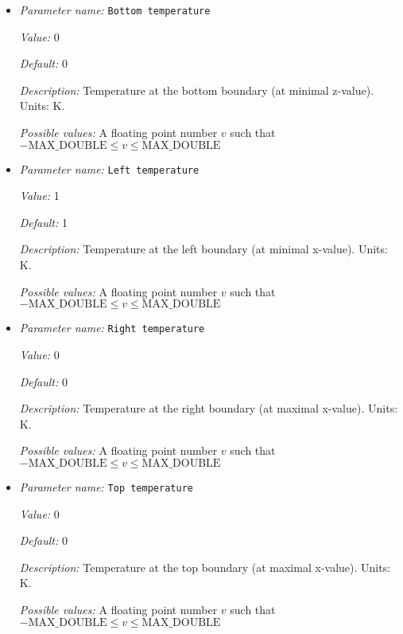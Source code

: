 \begin{itemize}
\item {\it Parameter name:} {\tt Bottom temperature}
\label{parameters:Boundary temperature model/Box/Bottom temperature}


{\it Value:} 0


{\it Default:} 0


{\it Description:} Temperature at the bottom boundary (at minimal z-value). Units: K.


{\it Possible values:} A floating point number $v$ such that $-\text{MAX\_DOUBLE} \leq v \leq \text{MAX\_DOUBLE}$
\item {\it Parameter name:} {\tt Left temperature}
\label{parameters:Boundary temperature model/Box/Left temperature}


{\it Value:} 1


{\it Default:} 1


{\it Description:} Temperature at the left boundary (at minimal x-value). Units: K.


{\it Possible values:} A floating point number $v$ such that $-\text{MAX\_DOUBLE} \leq v \leq \text{MAX\_DOUBLE}$
\item {\it Parameter name:} {\tt Right temperature}
\label{parameters:Boundary temperature model/Box/Right temperature}


{\it Value:} 0


{\it Default:} 0


{\it Description:} Temperature at the right boundary (at maximal x-value). Units: K.


{\it Possible values:} A floating point number $v$ such that $-\text{MAX\_DOUBLE} \leq v \leq \text{MAX\_DOUBLE}$
\item {\it Parameter name:} {\tt Top temperature}
\label{parameters:Boundary temperature model/Box/Top temperature}


{\it Value:} 0


{\it Default:} 0


{\it Description:} Temperature at the top boundary (at maximal x-value). Units: K.


{\it Possible values:} A floating point number $v$ such that $-\text{MAX\_DOUBLE} \leq v \leq \text{MAX\_DOUBLE}$
\end{itemize}

